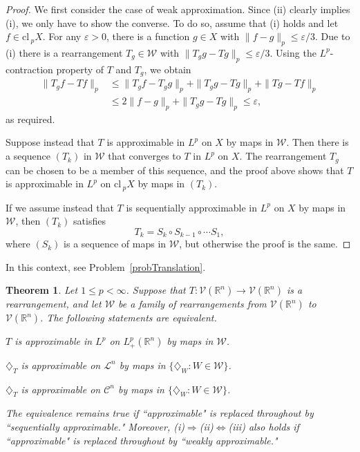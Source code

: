 \documentclass[12pt,reqno]{amsart}
\newcommand{\ee}{\varepsilon}
\newcommand{\R}{{\mathbb R}}
\newcommand{\cV}{{\mathcal V}}
\newcommand{\cW}{{\mathcal W}}
\newtheorem{thm}{Theorem}[section]
\newcommand{\cl}{{\mathrm{cl}}\,}
\newcommand{\di}{\diamondsuit}
\numberwithin{equation}{section}
\begin{document}
\begin{proof}
We first consider the case of weak approximation. Since (ii) clearly implies (i), we only have to show the converse. To do so, assume that (i) holds and let $f\in \cl_{\!p} X$. For any $\ee>0$, there is a function $g\in X$ with $\|f-g\|_p\le \ee/3$. Due to (i) there is a rearrangement $T_g\in \cW$  with $\|T_gg-Tg\|_p\le \ee/3$. Using the $L^p$-contraction property of $T$ and $T_g$, we obtain
\begin{align*}
\| T_gf-Tf\|_p&\le \| T_gf-T_gg\|_p+\| T_gg-Tg\|_p+\| Tg-Tf\|_p\\
& \le  2\|f-g\|_p+\| T_gg-Tg\|_p\le \ee,
\end{align*}
as required.

Suppose instead that $T$ is approximable in $L^p$ on $X$ by maps in $\cW$.  Then there is a sequence $(T_k)$ in $\cW$ that converges to $T$ in $L^p$ on $X$. The rearrangement $T_g$ can be chosen to be a member of this sequence, and the proof above shows that $T$ is approximable in $L^p$ on $\cl_{\!p}X$ by maps in $(T_k)$.

If we assume instead that $T$ is sequentially approximable in $L^p$ on $X$ by maps in $\cW$, then $(T_k)$ satisfies
$$T_{k}=S_{k}\circ S_{k-1}\circ\cdots S_{1},$$
where $(S_{k})$ is a sequence of maps in $\cW$, but otherwise the proof is the same.
\end{proof}

In this context, see Problem~\ref{probTranslation}.

\begin{thm}\label{thm514}
Let $1\le p<\infty$.  Suppose that $T:{\cV}(\R^n)\to {\cV}(\R^n)$ is a rearrangement, and let $\cW$ be a family of rearrangements from ${\cV}(\R^n)$ to $\cV(\R^n)$. The following statements are equivalent.

 $T$ is approximable in $L^p$ on $L^p_+(\R^n)$ by maps in $\cW$.

 $\di_T$ is approximable on $\mathcal L^n$ by maps in $\{\di_W:W\in \cW\}$.

 $\di_T$ is approximable on $\mathcal C^n$ by maps in $\{\di_W:W\in \cW\}$.

The equivalence remains true if ``approximable" is replaced throughout by ``sequentially approximable."  Moreover, {\em (i)}$\Rightarrow${\em (ii)}$\Leftrightarrow${\em (iii)} also holds if ``approximable" is replaced throughout by ``weakly approximable."
\end{thm}
\end{document}
